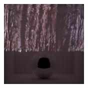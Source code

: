 \begin{figure}[]
\begin{subfigure}{\textwidth}
\begin{subfigure}{0.19\textwidth}
            \caption*{}
        \end{subfigure}
        \hfill
        \begin{subfigure}{0.19\textwidth}
            \centering
            \includegraphics[width=\textwidth]{images/04-experiment03/ball/wood/pixel_proj.jpg}
            \caption*{}
        \end{subfigure}


\end{subfigure}
\end{figure}
